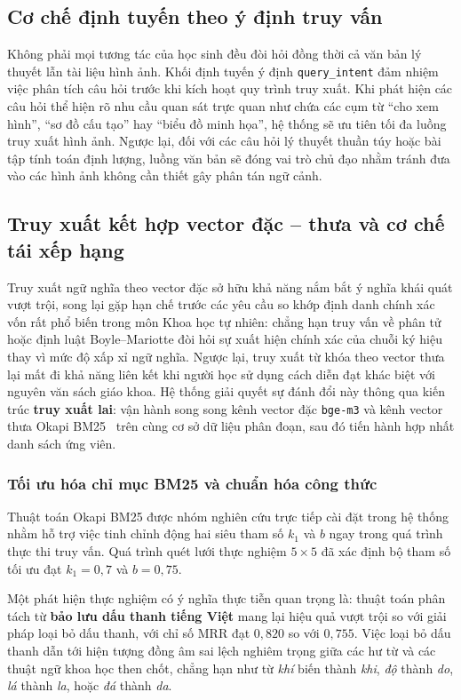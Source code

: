 \subsection{Cơ chế định tuyến theo ý định truy vấn}
Không phải mọi tương tác của học sinh đều đòi hỏi đồng thời cả văn bản lý thuyết lẫn tài liệu hình ảnh. Khối định tuyến ý định \texttt{query\_intent} đảm nhiệm việc phân tích câu hỏi trước khi kích hoạt quy trình truy xuất. Khi phát hiện các câu hỏi thể hiện rõ nhu cầu quan sát trực quan như chứa các cụm từ ``cho xem hình'', ``sơ đồ cấu tạo'' hay ``biểu đồ minh họa'', hệ thống sẽ ưu tiên tối đa luồng truy xuất hình ảnh. Ngược lại, đối với các câu hỏi lý thuyết thuần túy hoặc bài tập tính toán định lượng, luồng văn bản sẽ đóng vai trò chủ đạo nhằm tránh đưa vào các hình ảnh không cần thiết gây phân tán ngữ cảnh.

\subsection{Truy xuất kết hợp vector đặc -- thưa và cơ chế tái xếp hạng}
\label{sec:relevance_gate}
Truy xuất ngữ nghĩa theo vector đặc sở hữu khả năng nắm bắt ý nghĩa khái quát vượt trội, song lại gặp hạn chế trước các yêu cầu so khớp định danh chính xác vốn rất phổ biến trong môn Khoa học tự nhiên: chẳng hạn truy vấn về phân tử  hoặc định luật Boyle--Mariotte đòi hỏi sự xuất hiện chính xác của chuỗi ký hiệu thay vì mức độ xấp xỉ ngữ nghĩa. Ngược lại, truy xuất từ khóa theo vector thưa lại mất đi khả năng liên kết khi người học sử dụng cách diễn đạt khác biệt với nguyên văn sách giáo khoa. Hệ thống giải quyết sự đánh đổi này thông qua kiến trúc \textbf{truy xuất lai}: vận hành song song kênh vector đặc \texttt{bge-m3} và kênh vector thưa Okapi BM25~\cite{robertson2009bm25} trên cùng cơ sở dữ liệu phân đoạn, sau đó tiến hành hợp nhất danh sách ứng viên.

\subsubsection{Tối ưu hóa chỉ mục BM25 và chuẩn hóa công thức}
Thuật toán Okapi BM25 được nhóm nghiên cứu trực tiếp cài đặt trong hệ thống nhằm hỗ trợ việc tinh chỉnh động hai siêu tham số $k_1$ và $b$ ngay trong quá trình thực thi truy vấn. Quá trình quét lưới thực nghiệm $5 \times 5$ đã xác định bộ tham số tối ưu đạt $k_1 = 0{,}7$ và $b = 0{,}75$.

Một phát hiện thực nghiệm có ý nghĩa thực tiễn quan trọng là: thuật toán phân tách từ \textbf{bảo lưu dấu thanh tiếng Việt} mang lại hiệu quả vượt trội so với giải pháp loại bỏ dấu thanh, với chỉ số MRR đạt $0{,}820$ so với $0{,}755$. Việc loại bỏ dấu thanh dẫn tới hiện tượng đồng âm sai lệch nghiêm trọng giữa các hư từ và các thuật ngữ khoa học then chốt, chẳng hạn như từ \textit{khí} biến thành \textit{khi}, \textit{độ} thành \textit{do}, \textit{lá} thành \textit{la}, hoặc \textit{đá} thành \textit{da}.

